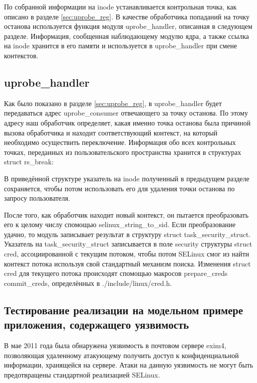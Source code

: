 По собранной информации на inode устанавливается контрольная точка, как
описано в разделе \ref{sec:uprobe_reg}. В качестве обработчика попаданий
на точку останова используется функция модуля uprobe\_handler, описанная
в следующем разделе.  Информация, сообщенная наблюдающему модулю ядра, а
также ссылка на inode хранится в его памяти и используется в
uprobe\_handler при смене контекстов.

\subsection{uprobe\_handler}

Как было показано в разделе \ref{sec:uprobe_reg}, в uprobe\_handler
будет передаваться адрес uprobe\_consumer отвечающего за точку останова.
По этому адресу наш обработчик определяет, какая именно точка останова
была причиной вызова обработчика и находит соответствующий контекст, на
который необходимо осуществить переключение. Информация обо всех
контрольных точках, переданных из пользовательского пространства
хранится в структурах struct rs\_break:


\bigskip

В приведённой структуре указатель на inode полученный в предыдущем
разделе сохраняется, чтобы потом использовать его для удаления точки
останова по запросу пользователя. 

После того, как обработчик находит новый контекст, он пытается
преобразовать его к целому числу спомощью selinux\_string\_to\_sid. Если
преобразование удачно, то модуль записывает результат в структуру struct
task\_security\_struct.  Указатель на task\_security\_struct
записывается в поле security структуры struct cred, ассоциированной с
текущим потоком, чтобы потом SELinux смог из найти контекст потока
используя свой стандартный механизм поиска. Изменения struct cred для
текущего потока происходят спомощью макросов prepare\_creds
commit\_creds, определённых в ./include/linux/cred.h.

\subsection{Тестирование реализации на модельном примере приложения,
                содержащего уязвимость}

В мае 2011 года была обнаружена уязвимость в почтовом сервере
exim4, позволяющая удаленному атакующему получить доступ к конфиденциальной
информации, хранящейся на сервере. Атаки на данную уязвимость не могут
быть предотвращены стандартной реализацией SELinux.


